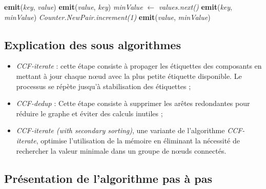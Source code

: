 \documentclass[conference]{IEEEtran}
\begin{document}
\begin{minipage}[t]{0.48\textwidth} %
\tiny %
\begin{algorithm}[H]
\caption{CCF-Iterate (with secondary sorting)}
\label{alg:ccf_iterate_secondary_sorting}
\begin{algorithmic}[1]
        \State \textbf{emit}(\textit{key}, \textit{value})
        \State \textbf{emit}(\textit{value}, \textit{key})
    \EndFunction
        \State \textit{minValue} $\gets$ \textit{values.next()}
            \State \textbf{emit}(\textit{key}, \textit{minValue})
        \EndIf
            \State \textit{Counter.NewPair.increment(1)}
            \State \textbf{emit}(\textit{value}, \textit{minValue})
        \EndFor
    \EndFunction
\end{algorithmic}
\end{algorithm}
\end{minipage}



\subsection{Explication des sous algorithmes}

\begin{itemize}
\item \textit{CCF-iterate} : cette étape consiste à propager les étiquettes des composants en mettant à jour chaque nœud avec la plus petite étiquette disponible. Le processus se répète jusqu'à stabilisation des étiquettes ;
\item \textit{CCF-dedup} : Cette étape consiste à supprimer les arêtes redondantes pour réduire le graphe et éviter des calculs inutiles ;
\item \textit{CCF-iterate (with secondary sorting)}, une variante de l'algorithme \textit{CCF-iterate}, optimise l'utilisation de la mémoire en éliminant la nécessité de rechercher la valeur minimale dans un groupe de nœuds connectés.
\end{itemize}

\subsection{Présentation de l'algorithme pas à pas}
\end{document}
